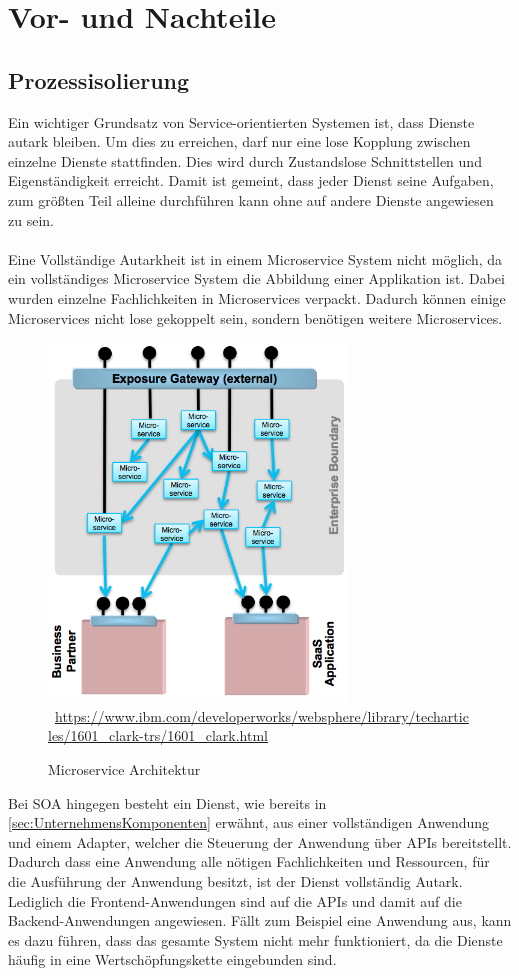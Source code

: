 \section{Vor- und Nachteile}
\label{sec:VorUndNachteile}

\subsection{Prozessisolierung}
\label{subsec:Prozessisiolierung}
Ein wichtiger Grundsatz von Service-orientierten Systemen ist, dass Dienste autark bleiben. Um dies zu erreichen, darf nur eine lose Kopplung zwischen einzelne Dienste stattfinden. Dies wird durch Zustandslose Schnittstellen und Eigenständigkeit erreicht. Damit ist gemeint, dass jeder Dienst seine Aufgaben, zum größten Teil alleine durchführen kann ohne auf andere Dienste angewiesen zu sein.
\\\\
Eine Vollständige Autarkheit ist in einem Microservice System nicht möglich, da ein vollständiges Microservice System die Abbildung einer Applikation ist. Dabei wurden einzelne Fachlichkeiten in Microservices verpackt. Dadurch können einige Microservices nicht lose gekoppelt sein, sondern benötigen weitere Microservices.

\begin{figure}[htb]
    \centering 
    \includegraphics[width=300px]{content/images/figure6}\
    \quelle\url{https://www.ibm.com/developerworks/websphere/library/techarticles/1601_clark-trs/1601_clark.html}
    \caption{Microservice Architektur}
    \label{fig:MicroserviceArchitekturInGreenField} 
\end{figure}
\newpage
Bei SOA hingegen besteht ein Dienst, wie bereits in \ref{sec:UnternehmensKomponenten}  erwähnt, aus einer vollständigen Anwendung und einem Adapter, welcher die Steuerung der Anwendung über APIs bereitstellt. Dadurch dass eine Anwendung alle nötigen Fachlichkeiten und Ressourcen, für die Ausführung der Anwendung besitzt, ist der Dienst vollständig Autark. Lediglich die Frontend-Anwendungen sind auf die APIs und damit auf die Backend-Anwendungen angewiesen. Fällt zum Beispiel eine Anwendung aus, kann es dazu führen, dass das gesamte System nicht mehr funktioniert, da die Dienste häufig in eine Wertschöpfungskette eingebunden sind.

